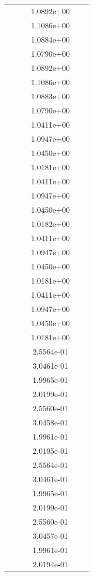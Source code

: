 \begin{xltabular}{\textwidth}{r|rS[table-format=1.3e+2]S[table-format=1.4e+2]S[table-format=1.4e+2]S[table-format=-1.5]}
&  &  & 1.0892e+00 & & \\
&  &  & 1.1086e+00 & & \\
&  &  & 1.0884e+00 & & \\
&  &  & 1.0790e+00 & & \\
&  &  & 1.0892e+00 & & \\
&  &  & 1.1086e+00 & & \\
&  &  & 1.0883e+00 & & \\
&  &  & 1.0790e+00 & & \\
&  &  & 1.0411e+00 & & \\
&  &  & 1.0947e+00 & & \\
&  &  & 1.0450e+00 & & \\
&  &  & 1.0181e+00 & & \\
&  &  & 1.0411e+00 & & \\
&  &  & 1.0947e+00 & & \\
&  &  & 1.0450e+00 & & \\
&  &  & 1.0182e+00 & & \\
&  &  & 1.0411e+00 & & \\
&  &  & 1.0947e+00 & & \\
&  &  & 1.0450e+00 & & \\
&  &  & 1.0181e+00 & & \\
&  &  & 1.0411e+00 & & \\
&  &  & 1.0947e+00 & & \\
&  &  & 1.0450e+00 & & \\
&  &  & 1.0181e+00 & & \\
&  &  & 2.5564e-01 & & \\
&  &  & 3.0461e-01 & & \\
&  &  & 1.9965e-01 & & \\
&  &  & 2.0199e-01 & & \\
&  &  & 2.5560e-01 & & \\
&  &  & 3.0458e-01 & & \\
&  &  & 1.9961e-01 & & \\
&  &  & 2.0195e-01 & & \\
&  &  & 2.5564e-01 & & \\
&  &  & 3.0461e-01 & & \\
&  &  & 1.9965e-01 & & \\
&  &  & 2.0199e-01 & & \\
&  &  & 2.5560e-01 & & \\
&  &  & 3.0457e-01 & & \\
&  &  & 1.9961e-01 & & \\
&  &  & 2.0194e-01 & & \\

\end{xltabular}
